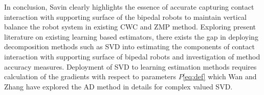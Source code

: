 \vspace{4mm}

In conclusion, Savin clearly highlights the essence of accurate capturing contact interaction with supporting surface of the bipedal robots \cite{Savin8875522} to maintain vertical balance the robot system in existing CWC \cite{cwc7139910} and ZMP \cite{zmp1241826} method. Exploring present literature on existing learning based estimators\cite{dnn8501736,rl48550}, there exists the gap in deploying decomposition methods such as SVD into estimating the components of contact interaction with supporting surface of bipedal robots and investigation of method accuracy measures. Deployment of SVD to learning estimation methods requires calculation of the gradients with respect to parameters $P$\ref{eq:def}\cite{gdc04747,gas11046} which Wan and Zhang \cite{grad02659} have explored the AD method in details for complex valued SVD.   





